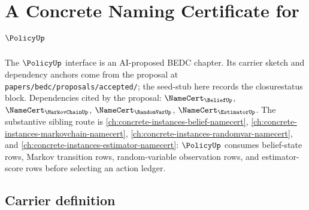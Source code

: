 \chapter{A Concrete Naming Certificate for $\PolicyUp$}
\label{ch:concrete-instances-policy-namecert}

The $\PolicyUp$ interface is an AI-proposed BEDC chapter. Its carrier
sketch and dependency anchors come from the proposal at
\texttt{papers/bedc/proposals/accepted/}; the seed-stub here records
the closurestatus block. Dependencies cited by the proposal:
$\NameCert_{\BeliefUp}$, $\NameCert_{\MarkovChainUp}$, $\NameCert_{\RandomVarUp}$, $\NameCert_{\EstimatorUp}$.
The substantive sibling route is \autoref{ch:concrete-instances-belief-namecert}, \autoref{ch:concrete-instances-markovchain-namecert}, \autoref{ch:concrete-instances-randomvar-namecert}, and \autoref{ch:concrete-instances-estimator-namecert}: $\PolicyUp$ consumes belief-state rows, Markov transition rows, random-variable observation rows, and estimator-score rows before selecting an action ledger.

\section{Carrier definition}
\label{sec:policy-carrier}

